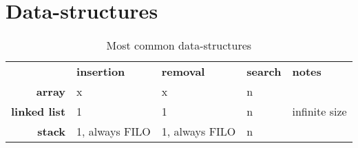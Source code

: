 \section{Data-structures}


\begin{table}[ht]
	\centering
	\caption{Most common data-structures}
	\begin{tabularx}{1.2\textwidth}{@{}rllll@{}}
		\toprule
		\multicolumn{1}{l}{}             & \textbf{insertion}                                                     & \textbf{removal}                                                                                    & \textbf{search}                                                      & \textbf{notes}                                                                                                                                                                                                                       \\
		\cmidrule(l){2-5} 
		\multicolumn{1}{r|}{\textbf{array}}       & x                                                                      & x                                                                                                   & n                                                                    &                                                                                                                                                                                                                                      \\
		\multicolumn{1}{r|}{\textbf{linked list}} & 1                                                                      & 1                                                                                                   & n                                                                    & infinite size                                                                                                                                                                                                                        \\
		\multicolumn{1}{r|}{\textbf{stack}}       & 1, always FILO                                                         & 1, always FILO                                                                                      & n                                                                    &                                                                                                                                                                                                                                      \\

\end{tabularx}
\end{table}
